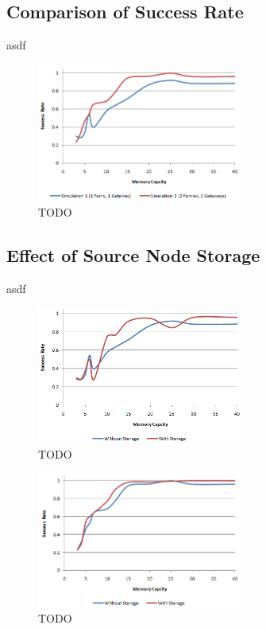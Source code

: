 \subsection{Comparison of Success Rate}

asdf

\begin{figure}[ht]
    \centering
    \includegraphics[width=0.6\textwidth]{images/result_sccess_bothsim_128_dss}
    \caption{TODO}
\end{figure}

\subsection{Effect of Source Node Storage}

asdf

\begin{figure}[ht]
    \centering
    \includegraphics[width=0.6\textwidth]{images/result_sccess_sim1byss_128}
    \caption{TODO}
\end{figure}

\begin{figure}[ht]
    \centering
    \includegraphics[width=0.6\textwidth]{images/result_sccess_sim2byss_128}
    \caption{TODO}
\end{figure}

